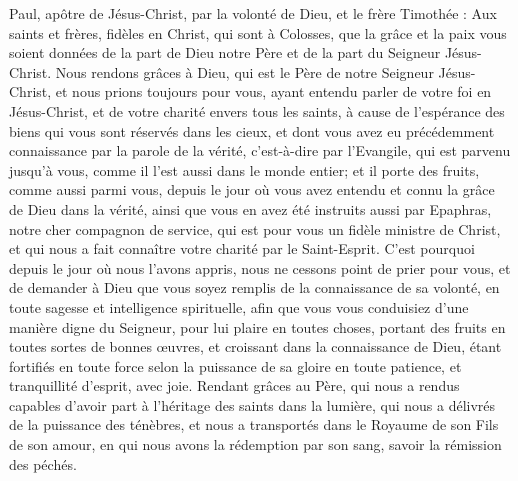 \begin{multicols}{2}
\VerseOne{}Paul, apôtre de Jésus-Christ, par la volonté de Dieu, et le frère Timothée :
Aux saints et frères, fidèles en Christ, qui sont à Colosses, que la grâce et la paix vous soient données de la part de Dieu notre Père et de la part du Seigneur Jésus-Christ.
Nous rendons grâces à Dieu, qui est le Père de notre Seigneur Jésus-Christ, et nous prions toujours pour vous,
ayant entendu parler de votre foi en Jésus-Christ, et de votre charité envers tous les saints,
à cause de l'espérance des biens qui vous sont réservés dans les cieux, et dont vous avez eu précédemment connaissance par la parole de la vérité, c'est-à-dire par l'Evangile,
qui est parvenu jusqu'à vous, comme il l'est aussi dans le monde entier; et il porte des fruits, comme aussi parmi vous, depuis le jour où vous avez entendu et connu la grâce de Dieu dans la vérité,
ainsi que vous en avez été instruits aussi par Epaphras, notre cher compagnon de service, qui est pour vous un fidèle ministre de Christ,
et qui nous a fait connaître votre charité par le Saint-Esprit.
C'est pourquoi depuis le jour où nous l'avons appris, nous ne cessons point de prier pour vous, et de demander à Dieu que vous soyez remplis de la connaissance de sa volonté, en toute sagesse et intelligence spirituelle,
afin que vous vous conduisiez d'une manière digne du Seigneur, pour lui plaire en toutes choses, portant des fruits en toutes sortes de bonnes œuvres, et croissant dans la connaissance de Dieu,
étant fortifiés en toute force selon la puissance de sa gloire en toute patience, et tranquillité d'esprit, avec joie.
Rendant grâces au Père, qui nous a rendus capables d'avoir part à l'héritage des saints dans la lumière,
qui nous a délivrés de la puissance des ténèbres, et nous a transportés dans le Royaume de son Fils de son amour,
en qui nous avons la rédemption par son sang, savoir la rémission des péchés.

\end{multicols}
